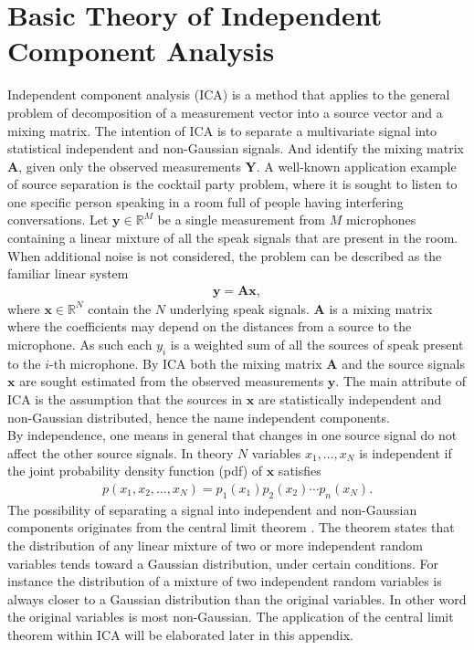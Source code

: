\section{Basic Theory of Independent Component Analysis}
Independent component analysis (ICA) is a method that applies to the general problem of decomposition of a measurement vector into a source vector and a mixing matrix. 
The intention of ICA is to separate a multivariate signal into statistical independent and non-Gaussian signals. And identify the mixing matrix $\mathbf{A}$, given only the observed measurements $\mathbf{Y}$.
A well-known application example of source separation is the cocktail party problem, where it is sought to listen to one specific person speaking in a room full of people having interfering conversations. 
Let $\mathbf{y} \in \mathbb{R}^M$ be a single measurement from $M$ microphones containing a linear mixture of all the speak signals that are present in the room. 
When additional noise is not considered, the problem can be described as the familiar linear system 
\begin{align}\label{eq:ICA1}
\mathbf{y} = \mathbf{Ax},
\end{align}
where $\mathbf{x} \in \mathbb{R}^N$ contain the $N$ underlying speak signals. $\mathbf{A}$ is a mixing matrix where the coefficients may depend on the distances from a source to the microphone. 
As such each $y_i$ is a weighted sum of all the sources of speak present to the $i$-th microphone.
By ICA both the mixing matrix $\mathbf{A}$ and the source signals $\mathbf{x}$ are sought estimated from the observed measurements $\mathbf{y}$. 
The main attribute of ICA is the assumption that the sources in $\mathbf{x}$ are statistically independent and non-Gaussian distributed, hence the name independent components.
\\     
By independence, one means in general that changes in one source signal do not affect the other source signals. 
In theory $N$ variables $x_1, \dots , x_N$ is independent if the joint probability density function (pdf) of $\mathbf{x}$ satisfies
\begin{align*}
p(x_1, x_2, \dots, x_N) = p_1(x_1) p_2(x_2) \cdots p_n(x_N).
\end{align*}
The possibility of separating a signal into independent and non-Gaussian components originates from the central limit theorem \cite[p. 34]{ICA}. 
The theorem states that the distribution of any linear mixture of two or more independent random variables tends toward a Gaussian distribution, under certain conditions. 
For instance the distribution of a mixture of two independent random variables is always closer to a Gaussian distribution than the original variables. In other word the original variables is most non-Gaussian. 
The application of the central limit theorem within ICA will be elaborated later in this appendix.


